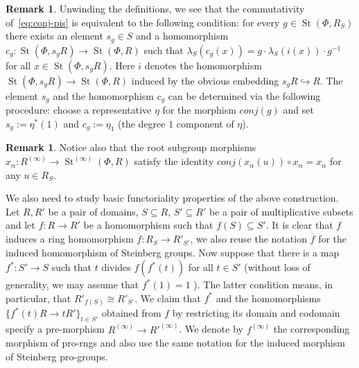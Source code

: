 \documentclass[oneside, 11pt]{amsart} \pdfoutput=1
\newcommand{\St}{\mathop{\mathrm{St}}\nolimits}
\numberwithin{equation}{section}
\theoremstyle{definition}
\newtheorem{rem}[lemma]{Remark}
\begin{document}
\begin{rem} \label{rem:conj-action}
Unwinding the definitions, we see that the commutativity of~\eqref{eq:conj-pis} is equivalent to the following condition: for every $g\in \St(\Phi, R_S)$ there exists an element $s_g\in S$ and a homomorphism $c_g \colon \St(\Phi, s_g R) \to \St(\Phi, R)$ such that $\lambda_S(c_g(x)) = g \cdot \lambda_S(i(x))\cdot g^{-1}$ for all $x\in \St(\Phi, s_g R)$. Here $i$ denotes the homomorphism $\St(\Phi, s_g R) \to \St(\Phi, R)$ induced by the obvious embedding $s_gR \hookrightarrow R$. The element $s_g$ and the homomorphism $c_g$ can be determined via the following procedure: choose a representative $\eta$ for the morphism $conj(g)$ and set $s_g := \eta^*(1)$ and $c_g := \eta_1$ (the degree $1$ component of $\eta$).
\end{rem}

\begin{rem} \label{rem:conj-root-action}
 Notice also that the root subgroup morphisms $x_\alpha \colon R^{(\infty)} \to \St^{(\infty)}(\Phi, R)$ satisfy the identity $conj(x_\alpha(u)) \circ x_\alpha = x_\alpha$ for any $u \in R_S$.
\end{rem}

We also need to study basic functoriality properties of the above construction.
Let $R, R'$ be a pair of domains, $S \subseteq R$, $S' \subseteq R'$ be a pair of multiplicative subsets and let $f \colon R \to R'$ be a homomorphism such that $f(S)\subseteq S'$.
It is clear that $f$ induces a ring homomorphism $\overline{f}\colon R_S \to R'_{S'}$, we also reuse the notation $\overline{f}$ for the induced homomorphism of Steinberg groups.
Now suppose that there is a map $f^* \colon S' \to S$ such that $t$ divides $f(f^*(t))$ for all $t \in S'$ (without loss of generality, we may assume that $f^*(1)=1$ ). The latter condition means, in particular, that $R'_{f(S)} \cong R'_{S'}$. We claim that $f^*$ and the homomorphisms $\{f^*(t)R \to tR'\}_{t\in S'}$ obtained from $f$ by restricting its domain and codomain specify a pre-morphism $R^{(\infty)} \to R'^{(\infty)}$. We denote by $f^{(\infty)}$ the corresponding morphism of pro-rngs and also use the same notation for the induced morphism of Steinberg pro-groups.
\end{document}
